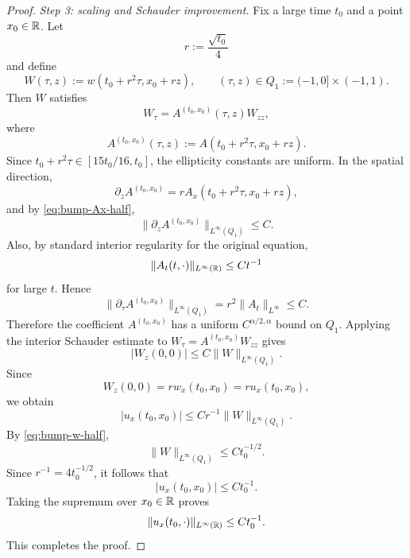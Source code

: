 \begin{proof}
    \emph{Step 3: scaling and Schauder improvement.}
    Fix a large time $t_0$ and a point $x_0\in\mathbb{R}$. Let
    \[
        r:=\dfrac{\sqrt{t_0}}{4}
    \]
    and define
    \[
        W(\tau,z):=w(t_0+r^2\tau,x_0+rz),
        \qquad (\tau,z)\in Q_1:=(-1,0]\times(-1,1).
    \]
    Then $W$ satisfies
    \[
        W_\tau=A^{(t_0,x_0)}(\tau,z)W_{zz},
    \]
    where
    \[
        A^{(t_0,x_0)}(\tau,z)
        :=A(t_0+r^2\tau,x_0+rz).
    \]
    Since $t_0+r^2\tau\in[15t_0/16,t_0]$, the ellipticity constants are uniform. In the spatial direction,
    \[
        \partial_z A^{(t_0,x_0)}=rA_x(t_0+r^2\tau,x_0+rz),
    \]
    and by \eqref{eq:bump-Ax-half},
    \[
        \lVert \partial_z A^{(t_0,x_0)}\rVert_{L^{\infty}(Q_1)}\leq C.
    \]
    Also, by standard interior regularity for the original equation,
    \[
        \lVert A_t(t,\cdot)\rVert_{L^{\infty}(\mathbb{R})}\leq Ct^{-1}
    \]
    for large $t$. Hence
    \[
        \lVert \partial_\tau A^{(t_0,x_0)}\rVert_{L^{\infty}(Q_1)}
        =r^2\lVert A_t\rVert_{L^{\infty}}
        \leq C.
    \]
    Therefore the coefficient $A^{(t_0,x_0)}$ has a uniform $C^{\alpha/2,\alpha}$ bound on $Q_1$. Applying the interior Schauder estimate to $W_\tau=A^{(t_0,x_0)}W_{zz}$ gives
    \[
        |W_z(0,0)|\leq C\lVert W\rVert_{L^{\infty}(Q_1)}.
    \]
    Since
    \[
        W_z(0,0)=r w_x(t_0,x_0)=r u_x(t_0,x_0),
    \]
    we obtain
    \[
        |u_x(t_0,x_0)|
        \leq Cr^{-1}\lVert W\rVert_{L^{\infty}(Q_1)}.
    \]
    By \eqref{eq:bump-w-half},
    \[
        \lVert W\rVert_{L^{\infty}(Q_1)}
        \leq C t_0^{-1/2}.
    \]
    Since $r^{-1}=4t_0^{-1/2}$, it follows that
    \[
        |u_x(t_0,x_0)|\leq Ct_0^{-1}.
    \]
    Taking the supremum over $x_0\in\mathbb{R}$ proves
    \[
        \lVert u_x(t_0,\cdot)\rVert_{L^{\infty}(\mathbb{R})}\leq Ct_0^{-1}.
    \]
    This completes the proof.
\end{proof}